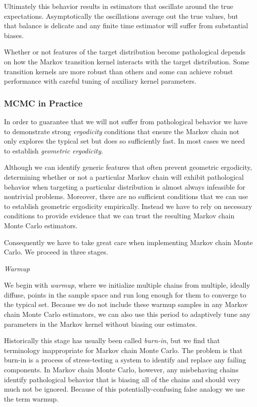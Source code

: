 \documentclass[11pt, oneside]{article}
\begin{document}
Ultimately this behavior results in estimators that oscillate 
around the true expectations.  Asymptotically the oscillations
average out the true values, but that balance is delicate and
any finite time estimator will suffer from substantial biases.

Whether or not features of the target distribution become
pathological depends on how the Markov transition kernel
interacts with the target distribution.  Some transition kernels
are more robust than others and some can achieve robust
performance with careful tuning of auxiliary kernel parameters.
 
\subsubsection{MCMC in Practice}

In order to guarantee that we will not suffer from pathological
behavior we have to demonstrate strong \emph{ergodicity}
conditions that ensure the Markov chain not only explores
the typical set but does so sufficiently fast.  In most cases
we need to establish \emph{geometric ergodicity}.

Although we can identify generic features that often prevent
geometric ergodicity, determining whether or not a particular
Markov chain will exhibit pathological behavior when 
targeting a particular distribution is almost always infeasible
for nontrivial problems.  Moreover, there are no sufficient
conditions that we can use to establish geometric ergodicity
empirically.  Instead we have to rely on necessary conditions 
to provide evidence that we can trust the resulting Markov 
chain Monte Carlo estimators.

Consequently we have to take great care when implementing
Markov chain Monte Carlo.  We proceed in three stages.

\vspace{2mm}
\noindent \emph{Warmup}
\vspace{2mm}

We begin with \emph{warmup}, where we initialize multiple
chains from multiple, ideally diffuse, points in the sample space
and run long enough for them to converge to the typical set.
Because we do not include these warmup samples in any
Markov chain Monte Carlo estimators, we can also use this
period to adaptively tune any parameters in the Markov 
kernel without biasing our estimates.

Historically this stage has usually been called \emph{burn-in},
but we find that terminology inappropriate for Markov chain
Monte Carlo.  The problem is that burn-in is a process of 
stress-testing a system to identify and replace any failing
components.  In Markov chain Monte Carlo, however, any
misbehaving chains identify pathological behavior that is
biasing all of the chains and should very much not be ignored.
Because of this potentially-confusing false analogy we use the
term warmup.
\end{document}
